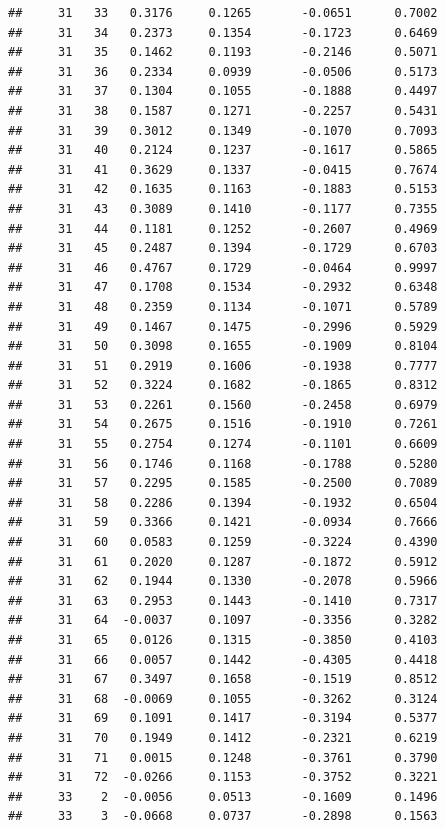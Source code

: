 \documentclass[
]{article}
\begin{document}
\begin{verbatim}
##     31   33   0.3176     0.1265       -0.0651      0.7002  
##     31   34   0.2373     0.1354       -0.1723      0.6469  
##     31   35   0.1462     0.1193       -0.2146      0.5071  
##     31   36   0.2334     0.0939       -0.0506      0.5173  
##     31   37   0.1304     0.1055       -0.1888      0.4497  
##     31   38   0.1587     0.1271       -0.2257      0.5431  
##     31   39   0.3012     0.1349       -0.1070      0.7093  
##     31   40   0.2124     0.1237       -0.1617      0.5865  
##     31   41   0.3629     0.1337       -0.0415      0.7674  
##     31   42   0.1635     0.1163       -0.1883      0.5153  
##     31   43   0.3089     0.1410       -0.1177      0.7355  
##     31   44   0.1181     0.1252       -0.2607      0.4969  
##     31   45   0.2487     0.1394       -0.1729      0.6703  
##     31   46   0.4767     0.1729       -0.0464      0.9997  
##     31   47   0.1708     0.1534       -0.2932      0.6348  
##     31   48   0.2359     0.1134       -0.1071      0.5789  
##     31   49   0.1467     0.1475       -0.2996      0.5929  
##     31   50   0.3098     0.1655       -0.1909      0.8104  
##     31   51   0.2919     0.1606       -0.1938      0.7777  
##     31   52   0.3224     0.1682       -0.1865      0.8312  
##     31   53   0.2261     0.1560       -0.2458      0.6979  
##     31   54   0.2675     0.1516       -0.1910      0.7261  
##     31   55   0.2754     0.1274       -0.1101      0.6609  
##     31   56   0.1746     0.1168       -0.1788      0.5280  
##     31   57   0.2295     0.1585       -0.2500      0.7089  
##     31   58   0.2286     0.1394       -0.1932      0.6504  
##     31   59   0.3366     0.1421       -0.0934      0.7666  
##     31   60   0.0583     0.1259       -0.3224      0.4390  
##     31   61   0.2020     0.1287       -0.1872      0.5912  
##     31   62   0.1944     0.1330       -0.2078      0.5966  
##     31   63   0.2953     0.1443       -0.1410      0.7317  
##     31   64  -0.0037     0.1097       -0.3356      0.3282  
##     31   65   0.0126     0.1315       -0.3850      0.4103  
##     31   66   0.0057     0.1442       -0.4305      0.4418  
##     31   67   0.3497     0.1658       -0.1519      0.8512  
##     31   68  -0.0069     0.1055       -0.3262      0.3124  
##     31   69   0.1091     0.1417       -0.3194      0.5377  
##     31   70   0.1949     0.1412       -0.2321      0.6219  
##     31   71   0.0015     0.1248       -0.3761      0.3790  
##     31   72  -0.0266     0.1153       -0.3752      0.3221  
##     33    2  -0.0056     0.0513       -0.1609      0.1496  
##     33    3  -0.0668     0.0737       -0.2898      0.1563  

\end{verbatim}
\end{document}
